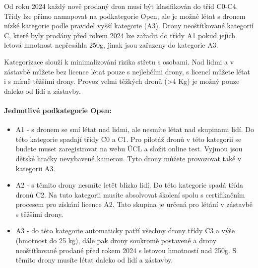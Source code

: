 Od roku 2024 každý nově prodaný dron musí být klasifikován do tříd C0-C4. Třídy lze přímo namapovat na podkategorie Open, ale je možné létat s dronem nízké kategorie podle pravidel vyšší kategorie (A3). Drony neoštítkované kategorií C, které byly prodány před rokem 2024 lze zařadit do třídy A1 pokud jejich letová hmotnost nepřesáhla 250g, jinak jsou zařazeny do kategorie A3.

Kategorizace slouží k minimalizování rizika střetu s osobami. Nad lidmi a v zástavbě můžete bez licence létat pouze s nejlehčími drony, s licencí můžete létat i s mírně těžšími drony. Provoz velmi těžkých dronů (>4 Kg) je možný pouze daleko od lidí a zástavby. 

\paragraph{Jednotlivé podkategorie Open:}
\begin{itemize}
    \item A1 - s dronem se smí létat nad lidmi, ale nesmíte létat nad skupinami lidí. Do této kategorie spadají třídy C0 a C1. Pro pilotáž dronů v této kategorii se budete muset zaregistrovat na webu ÚCL a složit online test. Vyjmou jsou dětské hračky nevybavené kamerou. Tyto drony můžete provozovat také v kategorii A3.

    \item A2 - s těmito drony nesmíte letět blízko lidí. Do této kategorie spadá třída dronů C2. Na tuto kategorii musíte absolvovat školení spolu s certifikačním procesem pro získání licence A2. Tato skupina je určená pro létání v zástavbě s těžšími drony.
    \item A3 - do této kategorie automaticky patří všechny drony třídy C3 a výše (hmotnost do 25 kg), dále pak drony soukromě postavené a drony neoštítkované prodané před rokem 2024 s letovou hmotností nad 250g. S těmito drony musíte létat daleko od lidí a zástavby.
\end{itemize}

